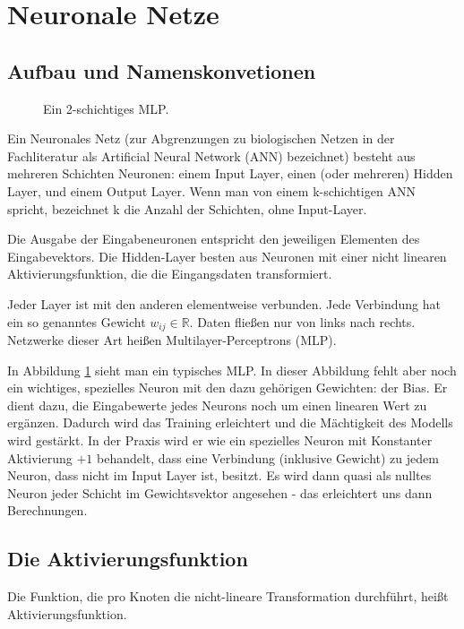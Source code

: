 \section{Neuronale Netze} %

\subsection{Aufbau und Namenskonvetionen}
\begin{figure}[ht!]
\label{fig:MLP}
  \centering
    
  \caption{Ein 2-schichtiges MLP.}
\end{figure}


Ein Neuronales Netz (zur Abgrenzungen zu biologischen Netzen in der Fachliteratur als Artificial Neural Network (ANN) bezeichnet) besteht aus mehreren Schichten Neuronen: einem Input Layer, einen (oder mehreren) Hidden Layer, und einem Output Layer. 
Wenn man von einem k-schichtigen ANN spricht, bezeichnet k die Anzahl der Schichten, ohne Input-Layer.

Die Ausgabe der Eingabeneuronen entspricht den jeweiligen Elementen des Eingabevektors.
Die Hidden-Layer besten aus Neuronen mit einer nicht linearen Aktivierungsfunktion, die die Eingangsdaten transformiert.

Jeder Layer ist mit den anderen elementweise verbunden. Jede Verbindung hat ein so genanntes Gewicht $w_{ij} \in \mathbb{R}$. Daten fließen nur von links nach rechts. Netzwerke dieser Art heißen Multilayer-Perceptrons (MLP). 

In Abbildung \ref{fig:MLP} sieht man ein typisches MLP. In dieser Abbildung fehlt aber noch ein wichtiges, spezielles Neuron mit den dazu gehörigen Gewichten: der Bias. Er dient dazu, die Eingabewerte jedes Neurons noch um einen linearen Wert zu ergänzen. Dadurch wird das Training erleichtert und die Mächtigkeit des Modells wird gestärkt. In der Praxis wird er wie ein spezielles Neuron mit Konstanter Aktivierung $+1$ behandelt, dass eine Verbindung (inklusive Gewicht) zu jedem Neuron, dass nicht im Input Layer ist, besitzt. Es wird dann quasi als nulltes Neuron jeder Schicht im Gewichtsvektor angesehen - das erleichtert uns dann Berechnungen.
 

\subsection{Die Aktivierungsfunktion}

Die Funktion, die pro Knoten die nicht-lineare Transformation durchführt, heißt Aktivierungsfunktion. 

